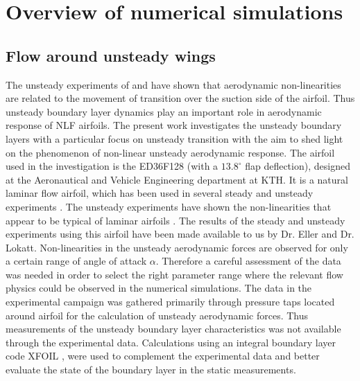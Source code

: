 \chapter{Overview of numerical simulations}

\section{Flow around unsteady wings}

The unsteady experiments of \cite{mai11,hebler13} and \cite{lokattthesis} have shown that aerodynamic non-linearities are related to the movement of transition over the suction side of the airfoil. Thus unsteady boundary layer dynamics play an important role in aerodynamic response of NLF airfoils. The present work investigates the unsteady boundary layers with a particular focus on unsteady transition with the aim to shed light on the phenomenon of non-linear unsteady aerodynamic response. The airfoil used in the investigation is the ED36F128 (with a $13.8^{\circ}$ flap deflection), designed at the Aeronautical and Vehicle Engineering department at KTH. It is a natural laminar flow airfoil, which has been used in several steady and unsteady experiments \citep{lokatt17,lokattthesis}. The unsteady experiments have shown the non-linearities that appear to be typical of laminar airfoils \citep{lokattthesis}. The results of the steady and unsteady experiments using this airfoil have been made available to us by Dr. Eller and Dr. Lokatt. Non-linearities in the unsteady aerodynamic forces are observed for only a certain range of angle of attack $\alpha$. Therefore a careful assessment of the data was needed in order to select the right parameter range where the relevant flow physics could be observed in the numerical simulations. The data in the experimental campaign was gathered primarily through pressure taps located around airfoil for the calculation of unsteady aerodynamic forces. Thus measurements of the unsteady boundary layer characteristics was not available through the experimental data. Calculations using an integral boundary layer code XFOIL \citep{drela89}, were used to complement the experimental data and better evaluate the state of the boundary layer in the static measurements.


